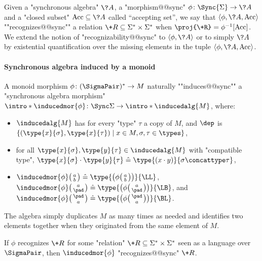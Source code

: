 Given a "synchronous algebra" $\?A$, a "morphism@@sync" $\phi\colon \Sync{\Sigma} \to \?A$
and a "closed subset" $\Acc \subseteq \?A$ called ``accepting set'',
we say that $\langle \phi, \?A, \Acc \rangle$
\AP""recognizes@@sync"" a relation $\+R \subseteq \Sigma^* \times \Sigma^*$
when $\proj{\+R} = \phi^{-1}[\Acc]$.
We extend the notion of "recognizability@@sync" to $\langle \phi, \?A\rangle$
or to simply $\?A$ by existential quantification over the missing elements in the tuple $\langle \phi, \?A, \Acc \rangle$.

\paragraph*{Synchronous algebra induced by a monoid}
A monoid morphism $\phi\colon (\SigmaPair)^* \to M$
naturally ""induces@@sync"" a "synchronous algebra morphism"
\AP$\intro*\inducedmor{\phi} \colon \Sync\Sigma \to \intro*\inducedalg{M}$,
where:
\begin{itemize}
	\item $\inducedalg{M}$ has for every "type" $\tau$ a copy of $M$,
	and $\dep$ is $\{(\type{x}{\sigma}, \type{x}{\tau}) \mid x \in M, \sigma, \tau \in \types\}$,
	\item for all $\type{x}{\sigma}, \type{y}{\tau} \in \inducedalg{M}$
	with "compatible type", $\type{x}{\sigma} \cdot \type{y}{\tau} \defeq \type{(x\cdot y)}{\sigma\concattype\tau}$,
	\item $\inducedmor{\phi}\pair{a}{b} \defeq \type{\bigl(\phi\pair{a}{b}\bigr)}{\LL}$,
		$\inducedmor{\phi}\pair{a}{\pad} \defeq \type{\bigl(\phi\pair{a}{\pad}\bigr)}{\LB}$,
		and $\inducedmor{\phi}\pair{\pad}{a} \defeq \type{\bigl(\phi\pair{\pad}{a}\bigr)}{\BL}$.
\end{itemize}
The algebra simply duplicates $M$ as many times as needed and identifies
two elements together when they originated from the same element of $M$.
\begin{fact}
	\AP\label{fact:induced-morphism}
	If $\phi$ recognizes $\+R$ for some "relation" $\+R \subseteq \Sigma^* \times \Sigma^*$ seen as a language over $\SigmaPair$, then $\inducedmor{\phi}$ "recognizes@@sync" $\+R$.
\end{fact}

